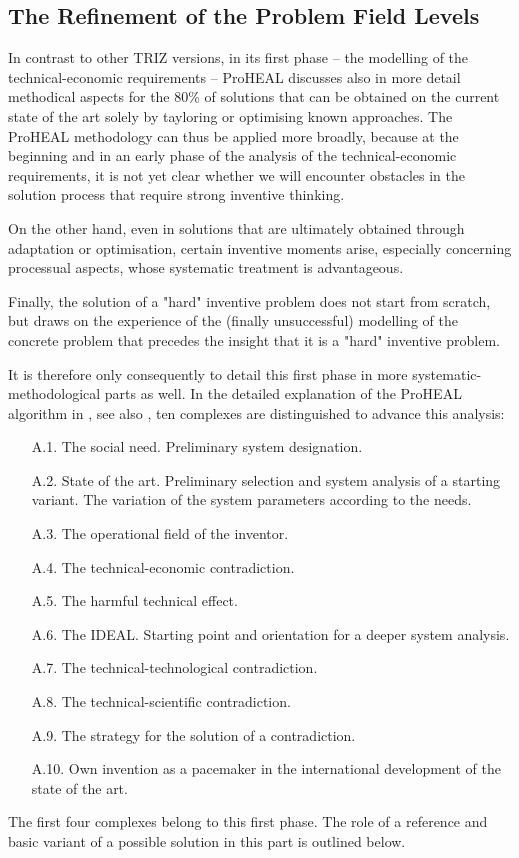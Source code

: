 \documentclass[11pt,a4paper]{article}
\begin{document}
\subsection{The Refinement of the Problem Field Levels}

In contrast to other TRIZ versions, in its first phase -- the modelling of the
technical-economic requirements -- ProHEAL discusses also in more detail
methodical aspects for the 80\% of solutions that can be obtained on the
current state of the art solely by tayloring or optimising known approaches.
The ProHEAL methodology can thus be applied more broadly, because at the
beginning and in an early phase of the analysis of the technical-economic
requirements, it is not yet clear whether we will encounter obstacles in the
solution process that require strong inventive thinking.

On the other hand, even in solutions that are ultimately obtained through
adaptation or optimisation, certain inventive moments arise, especially
concerning processual aspects, whose systematic treatment is advantageous.

Finally, the solution of a "hard" inventive problem does not start from
scratch, but draws on the experience of the (finally unsuccessful) modelling
of the concrete problem that precedes the insight that it is a "hard"
inventive problem.

It is therefore only consequently to detail this first phase in more
systematic-methodological parts as well.  In the detailed explanation of the
ProHEAL algorithm in \cite[Part A]{RT89}, see also \cite[Part 3]{RM-21}, ten
complexes are distinguished to advance this analysis:
\begin{itemize}[leftmargin=40pt,align=left]
\item[A.1.] The social need. Preliminary system designation.
\item[A.2.] State of the art. Preliminary selection and system analysis of a
  starting variant. The variation of the system parameters according to the
  needs.
\item[A.3.] The operational field of the inventor.
\item[A.4.] The technical-economic contradiction.
\item[A.5.] The harmful technical effect.
\item[A.6.] The IDEAL. Starting point and orientation for a deeper system
  analysis.
\item[A.7.] The technical-technological contradiction.
\item[A.8.] The technical-scientific contradiction.
\item[A.9.] The strategy for the solution of a contradiction.
\item[A.10.] Own invention as a pacemaker in the international
  development of the state of the art.
\end{itemize}
The first four complexes belong to this first phase.  The role of a reference
and basic variant of a possible solution in this part is outlined below.
\end{document}

